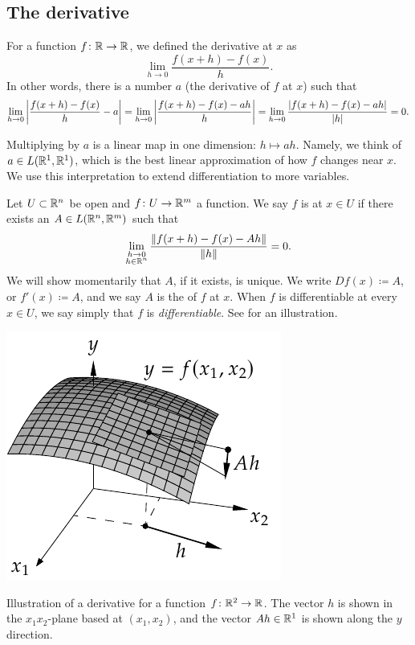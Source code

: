 
\subsection{The derivative}

For a function $f \colon {\mathbb{R}} \to {\mathbb{R}}$, we defined
the derivative at $x$ as
\begin{equation*}
\lim_{h \to 0} \frac{f(x+h)-f(x)}{h} .
\end{equation*}
In other words, there is a number $a$ (the derivative of $f$ at $x$) such that
\begin{equation*}
\lim_{h \to 0} \left\lvert {\frac{f(x+h)-f(x)}{h} - a} \right\rvert
=
\lim_{h \to 0} \left\lvert {\frac{f(x+h)-f(x) - ah}{h}} \right\rvert
=
\lim_{h \to 0} \frac{\lvert {f(x+h)-f(x) - ah} \rvert}{\lvert {h} \rvert}
= 0.
\end{equation*}

Multiplying by $a$ is a linear map in one dimension:
$h \mapsto ah$.
Namely,
we think of $a \in L({\mathbb{R}}^1,{\mathbb{R}}^1)$, 
which is the best linear approximation of
how $f$ changes near $x$.  We use this interpretation
to extend differentiation to more variables.

\begin{defn}
Let $U \subset {\mathbb{R}}^n$ be open and $f \colon U \to {\mathbb{R}}^m$ a function.  We
say $f$ is \emph{} at $x \in U$ if there exists
an $A \in L({\mathbb{R}}^n,{\mathbb{R}}^m)$ such that
\begin{equation*}
\lim_{\substack{h \to 0\\h\in {\mathbb{R}}^n}}
\frac{\lVert {f(x+h)-f(x) - Ah} \rVert}{\lVert {h} \rVert} = 0 .
\end{equation*}
We will show momentarily that $A$, if it exists, is unique.
We write $Df(x) \coloneqq A$, or $f'(x) \coloneqq A$, and
we say $A$ is the \emph{} of $f$ at $x$.
When $f$ is differentiable at
every $x \in U$, we say simply that $f$ is \emph{differentiable}.  See
 for an illustration.
\end{defn}

\begin{myfigureht}
\includegraphics{figures/svder}
\caption{Illustration of a derivative for a function $f \colon {\mathbb{R}}^2 \to {\mathbb{R}}$.  The vector $h$ is shown
in the $x_1x_2$-plane based at $(x_1,x_2)$, and the vector
$Ah \in {\mathbb{R}}^1$ is shown along the $y$ direction.\label{fig:svder}}
\end{myfigureht}

